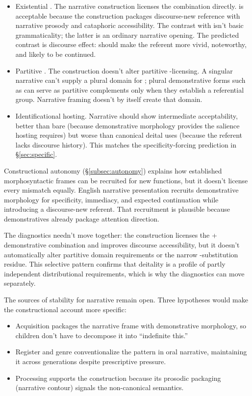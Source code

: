 \documentclass[12pt,letterpaper]{article}
\begin{document}
\begin{itemize}
    \item Existential . The narrative construction licenses the combination directly.  is acceptable because the construction packages discourse-new reference with narrative prosody and cataphoric accessibility. The contrast with  isn't basic grammaticality; the latter is an ordinary narrative opening. The predicted contrast is discourse effect:  should make the referent more vivid, noteworthy, and likely to be continued.

    \item Partitive . The construction doesn't alter partitive -licensing. A singular narrative  can't supply a plural domain for ; plural demonstrative forms such as  can serve as partitive complements only when they establish a referential group. Narrative framing doesn't by itself create that domain.

    \item Identificational hosting. Narrative  should show intermediate acceptability, better than bare  (because demonstrative morphology provides the salience hosting requires) but worse than canonical deital uses (because the referent lacks discourse history). This matches the specificity-forcing prediction in §\ref{sec:specific}.
\end{itemize}

Constructional autonomy (§\ref{subsec:autonomy}) explains how established morphosyntactic frames can be recruited for new functions, but it doesn't license every mismatch equally. English narrative presentation recruits demonstrative morphology for specificity, immediacy, and expected continuation while introducing a discourse-new referent. That recruitment is plausible because demonstratives already package attention direction.

The diagnostics needn't move together: the construction licenses the  + demonstrative combination and improves discourse accessibility, but it doesn't automatically alter partitive domain requirements or the narrow -substitution residue. This selective pattern confirms that deitality is a profile of partly independent distributional requirements, which is why the diagnostics can move separately.

The sources of stability for narrative  remain open. Three hypotheses would make the constructional account more specific:
\begin{itemize}
\item Acquisition packages the narrative frame with demonstrative morphology, so children don't have to decompose it into \enquote{indefinite this.}
\item Register and genre conventionalize the pattern in oral narrative, maintaining it across generations despite prescriptive pressure.
\item Processing supports the construction because its prosodic packaging (narrative contour) signals the non-canonical semantics.
\end{itemize}
\end{document}
